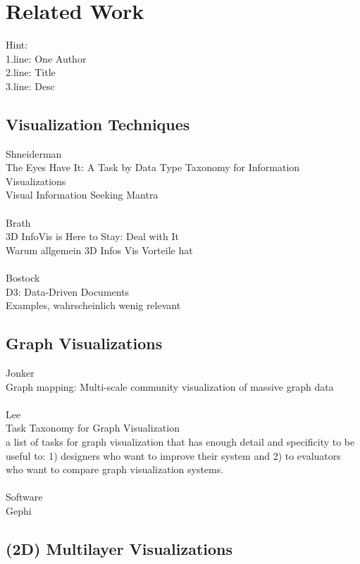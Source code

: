 \chapter{Related Work}

Hint:\\
1.line: One Author \\
2.line: Title \\
3.line: Desc\\

\section{Visualization Techniques}

Shneiderman\\
The Eyes Have It: A Task by Data Type Taxonomy for Information Visualizations\\
Visual Information Seeking Mantra\\
\\
Brath \\
3D InfoVis is Here to Stay: Deal with It\\
Warum allgemein 3D Infos Vis Vorteile hat\\
\\
Bostock\\
D3: Data-Driven Documents\\
Examples, wahrscheinlich wenig relevant\\

\section{Graph Visualizations}
Jonker\\
Graph mapping: Multi-scale community visualization of massive graph data\\
\\
Lee\\
Task Taxonomy for Graph Visualization\\
a list of tasks for graph visualization that has
enough detail and specificity to be useful to: 1) designers who
want to improve their system and 2) to evaluators who want to
compare graph visualization systems.\\
\\
Software\\
Gephi\\

\section{(2D) Multilayer Visualizations}

